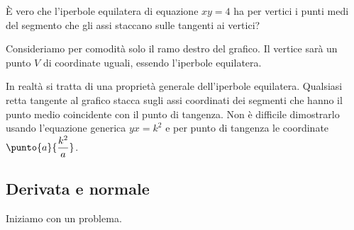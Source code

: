 \begin{esempio}
È vero che l'iperbole equilatera di equazione \(xy = 4\) ha per vertici i 
punti medi del segmento che gli assi staccano sulle tangenti ai vertici? 

Consideriamo per comodità solo il ramo destro del grafico.
Il vertice sarà un punto \(V\) di coordinate uguali, essendo l'iperbole
equilatera. 


\begin{osservazione}
In realtà si tratta di una proprietà generale dell'iperbole equilatera.
Qualsiasi retta tangente al grafico stacca sugli assi coordinati dei 
segmenti che hanno il punto medio coincidente con il punto di tangenza. 
Non è difficile dimostrarlo usando l'equazione generica \(yx=k^2\) e per 
punto di tangenza le coordinate \(\punto{a}{\dfrac{k^2}{a}}\).
\end{osservazione}
\end{esempio}

\subsection{Derivata e normale}
\label{subsec:differenziazione_normale}

Iniziamo con un problema.

